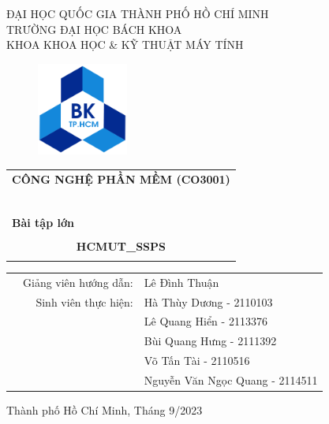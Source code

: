 \documentclass[a4paper]{article}
\begin{document}
	
	\begin{titlepage}
		\begin{center}
			ĐẠI HỌC QUỐC GIA THÀNH PHỐ HỒ CHÍ MINH \\
			TRƯỜNG ĐẠI HỌC BÁCH KHOA \\
			KHOA KHOA HỌC \& KỸ THUẬT MÁY TÍNH
		\end{center}
		
		\vspace{1cm}
		
		\begin{figure}[h!]
			\begin{center}
				\includegraphics[width=3cm]{hcmut.png}
			\end{center}
		\end{figure}
		
		\vspace{1cm}
		
		
		\begin{center}
			\begin{tabular}{c}
				\multicolumn{1}{l}{\textbf{{\Large CÔNG NGHỆ PHẦN MỀM (CO3001)}}}\\
				~~\\
				\hline
				\\
				\multicolumn{1}{l}{\textbf{{\Large Bài tập lớn}}}\\
				\\
				\textbf{{\Huge HCMUT\_SSPS}}\\
				\\
				\hline
			\end{tabular}
		\end{center}
		
		\vspace{3cm}
		
		\begin{table}[h]
			\begin{tabular}{rrl}
				\hspace{5 cm} & Giảng viên hướng dẫn: & Lê Đình Thuận\\
				& Sinh viên thực hiện: & Hà Thùy Dương - 2110103 \\
				& & Lê Quang Hiển - 2113376\\
 & & Bùi Quang Hưng - 2111392 \\
 & & Võ Tấn Tài - 2110516 \\
 & & Nguyễn Văn Ngọc Quang - 2114511\\
			\end{tabular}
		\end{table}
		
		\begin{center}
			{\footnotesize Thành phố Hồ Chí Minh, Tháng 9/2023}
		\end{center}
	\end{titlepage}
	
\end{document}

